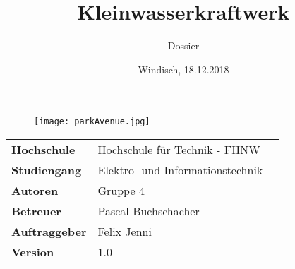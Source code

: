 \documentclass[final]{fhnwreport}       %
\title{Kleinwasserkraftwerk}          	%
\author{Dossier}          		%
\date{Windisch, 18.12.2018}             %
\begin{document}
\maketitle

\vspace*{-1cm}						    %
\vfill
\begin{figure} [H]
	\centering
	\texttt{[image: parkAvenue.jpg]}
	\label{fig:Park_Avenue_432}
\end{figure}
\vfill

{
\renewcommand\arraystretch{2}
\begin{center}
\begin{tabular}{ >{\bf} l p{10cm} l }
Hochschule&Hochschule für Technik - FHNW\\
Studiengang&Elektro- und Informationstechnik\\
Autoren&Gruppe 4\\%
Betreuer&Pascal Buchschacher\\
Auftraggeber&Felix Jenni\\
Version&1.0 %
\end{tabular}
\end{center}
}

\clearpage



\end{document}
